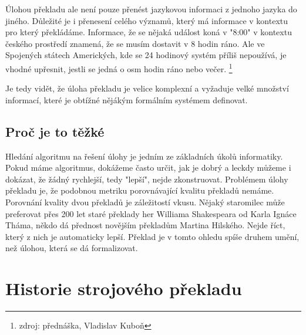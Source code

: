 \documentclass[12pt,a4paper]{report}
\begin{document}
Úlohou překladu ale není pouze přenést jazykovou informaci z jednoho jazyka do jiného. Důležité je i přenesení celého významů, který má informace v kontextu pro který překládáme. Informace, že se nějaká událost koná v "8:00" v kontextu českého prostředí znamená, že se musím dostavit v 8 hodin ráno. Ale ve Spojených státech Amerických, kde se 24 hodinový systém příliš nepoužívá, je vhodné upřesnit, jestli se jedná o osm hodin ráno nebo večer. \footnote{zdroj: přednáška, Vladislav Kuboň}

Je tedy vidět, že úloha překladu je velice komplexní a vyžaduje velké množství informací, které je obtížné nějákým formálním systémem definovat.


\subsection{Proč je to těžké}
Hledání algoritmu na řešení úlohy je jedním ze základních úkolů informatiky. Pokud máme algoritmus, dokážeme často určit, jak je dobrý a leckdy můžeme i dokázat, že žádný rychlejší, tedy "lepší", nejde zkonstruovat. Problémem úlohy překladu je, že podobnou metriku porovnávající kvalitu překladů nemáme. Porovnání kvality dvou překladů je záležitostí vkusu. Nějaký staromilec může preferovat přes 200 let staré překlady her Williama Shakespeara od Karla Ignáce Tháma, někdo dá přednost novějším překladům Martina Hilského. Nejde říct, který z nich je automaticky lepší. Překlad je v tomto ohledu spíše druhem umění, než úlohou, která se dá formalizovat.



\section{Historie strojového překladu}
\end{document}
